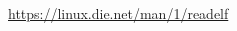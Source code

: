 \documentclass[10pt,twoside]{article}   %
\begin{document}
\begin{thebibliography}{9}

\url{https://linux.die.net/man/1/readelf}


\end{thebibliography}
\end{document}
